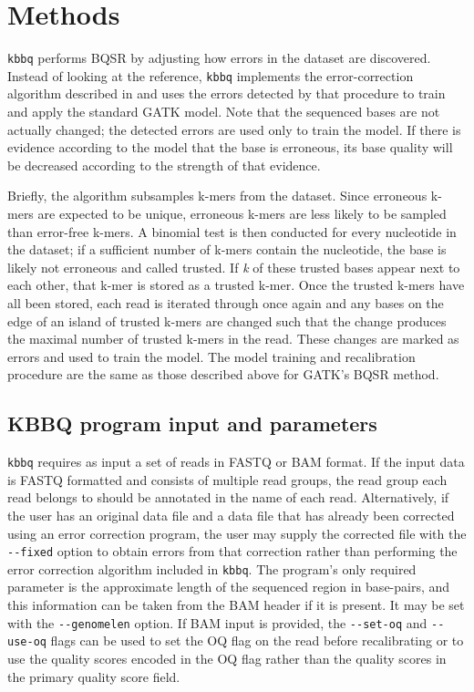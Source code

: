 \section{Methods}
\texttt{kbbq} performs BQSR by adjusting how errors in the dataset are discovered.
Instead of looking at the reference, \texttt{kbbq} implements the error-correction algorithm described in \cite{song_lighter_2014} and uses the errors detected by that procedure to train and apply the standard GATK model. Note that the sequenced bases are not actually changed; the detected errors are used only to train the model. If there is evidence according to the model that the base is erroneous, its base quality will be decreased according to the strength of that evidence.

Briefly, the algorithm subsamples k-mers from the dataset. Since erroneous k-mers are expected to be unique, erroneous k-mers are less likely to be sampled than error-free k-mers. A binomial test is then conducted for every nucleotide in the dataset; if a sufficient number of k-mers contain the nucleotide, the base is likely not erroneous and called trusted. If \textit{k} of these trusted bases appear next to each other, that k-mer is stored as a trusted k-mer. Once the trusted k-mers have all been stored, each read is iterated through once again and any bases on the edge of an island of trusted k-mers are changed such that the change produces the maximal number of trusted k-mers in the read. These changes are marked as errors and used to train the model.
The model training and recalibration procedure are the same as those described above for GATK's BQSR method.

\subsection{KBBQ program input and parameters}

\texttt{kbbq} requires as input a set of reads in FASTQ \parencite{cock_sanger_2010} or BAM \parencite{li_sequence_2009} format. If the input data is FASTQ formatted and consists of multiple read groups, the read group each read belongs to should be annotated in the name of each read. Alternatively, if the user has an original data file and a data file that has already been corrected using an error correction program, the user may supply the corrected file with the \texttt{-\phantom{}-fixed} option to obtain errors from that correction rather than performing the error correction algorithm included in \texttt{kbbq}. The program's only required parameter is the approximate length of the sequenced region in base-pairs, and this information can be taken from the BAM header if it is present. It may be set with the \texttt{-\phantom{}-genomelen} option. If BAM input is provided, the \texttt{-\phantom{}-set-oq} and \texttt{-\phantom{}-use-oq} flags can be used to set the OQ flag on the read before recalibrating or to use the quality scores encoded in the OQ flag rather than the quality scores in the primary quality score field.


